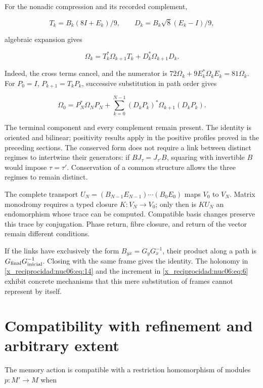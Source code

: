 For the nonadic compression and its recorded complement,

\[
T_k=B_k(8I+E_k)/9,\qquad
D_k=B_k\sqrt8(E_k-I)/9,
\]

algebraic expansion gives

\begin{equation}
\Omega_k=T_k^*\Omega_{k+1}T_k+D_k^*\Omega_{k+1}D_k.
\label{x_reciprocidad:nuc06:eq:17}
\end{equation}

Indeed, the cross terms cancel, and the numerator is \(72\Omega_k+9E_k^*\Omega_kE_k=81\Omega_k\). For \(P_0=I\), \(P_{k+1}=T_kP_k\), successive substitution in path order gives

\begin{equation}
\boxed{\quad
\Omega_0=P_N^*\Omega_NP_N+
\sum_{k=0}^{N-1}(D_kP_k)^*\Omega_{k+1}(D_kP_k).
\quad}
\label{x_reciprocidad:nuc06:eq:18}
\end{equation}

The terminal component and every complement remain present. The identity is oriented and bilinear; positivity results apply in the positive profiles proved in the preceding sections. The conserved form does not require a link between distinct regimes to intertwine their generators: if \(BJ_\tau=J_{\tau'}B\), squaring with invertible \(B\) would impose \(\tau=\tau'\). Conservation of a common structure allows the three regimes to remain distinct.

The complete transport \(U_N=(B_{N-1}E_{N-1})\cdots(B_0E_0)\) maps \(V_0\) to \(V_N\). Matrix monodromy requires a typed closure \(K:V_N\to V_0\); only then is \(KU_N\) an endomorphism whose trace can be computed. Compatible basis changes preserve this trace by conjugation. Phase return, fibre closure, and return of the vector remain different conditions.

If the links have exclusively the form \(B_{yx}=G_yG_x^{-1}\), their product along a path is \(G_{\rm final}G_{\rm inicial}^{-1}\). Closing with the same frame gives the identity. The holonomy in \eqref{x_reciprocidad:nuc06:eq:14} and the increment in \eqref{x_reciprocidad:nuc06:eq:6} exhibit concrete mechanisms that this mere substitution of frames cannot represent by itself.

\section{Compatibility with refinement and arbitrary extent}

The memory action is compatible with a restriction homomorphism of modules \(p:M'\to M\) when

